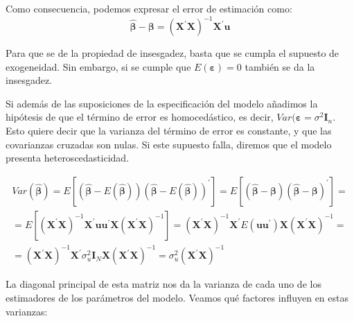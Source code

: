 Como consecuencia, podemos expresar el error de estimaci\'on como:
\begin{equation*}
\hat{\boldsymbol{\beta}}-\boldsymbol{\beta}=\left(\boldsymbol{X}^{\prime}\boldsymbol{X}\right)^{-1}\boldsymbol{X}^{\prime}\boldsymbol{u}
\end{equation*}

Para que se de la propiedad de insesgadez, basta que se cumpla el supuesto de exogeneidad. Sin embargo, si se cumple que $E(\boldsymbol{\varepsilon})=0$ tambi\'en se da la insesgadez.


Si adem\'as de las suposiciones de la especificaci\'on del modelo a\~nadimos la hip\'otesis de que el t\'ermino de error es homoced\'astico, es decir, $Var(\boldsymbol{\varepsilon}=\sigma^2\boldsymbol{I}_n$. Esto quiere decir que la varianza del t\'ermino de error es constante, y que las covarianzas cruzadas son nulas. Si este supuesto falla, diremos que el modelo presenta heteroscedasticidad.

\begin{equation*}
\begin{array}{c}
Var\left(\hat{\boldsymbol{\beta}}\right)=E\left[\left(\hat{\boldsymbol{\beta}}-E\left(\hat{\boldsymbol{\beta}}\right)\right)\left(\hat{\boldsymbol{\beta}}-E\left(\hat{\boldsymbol{\beta}}\right)\right)^{\prime}\right]=E\left[\left(\hat{\boldsymbol{\beta}}-\boldsymbol{\beta}\right)\left(\hat{\boldsymbol{\beta}}-\boldsymbol{\beta}\right)^{\prime}\right]=\\
=E\left[\left(\boldsymbol{X}^{\prime}\boldsymbol{X}\right)^{-1}\boldsymbol{X}^{\prime}\boldsymbol{u}\boldsymbol{u}^{\prime}\boldsymbol{X}\left(\boldsymbol{X}^{\prime}\boldsymbol{X}\right)^{-1}\right]=\left(\boldsymbol{X}^{\prime}\boldsymbol{X}\right)^{-1}\boldsymbol{X}^{\prime}E\left(\boldsymbol{u}\boldsymbol{u}^{\prime}\right)\boldsymbol{X}\left(\boldsymbol{X}^{\prime}\boldsymbol{X}\right)^{-1}=\\
=\left(\boldsymbol{X}^{\prime}\boldsymbol{X}\right)^{-1}\boldsymbol{X}^{\prime}\sigma_{u}^{2}\boldsymbol{I}_{N}\boldsymbol{X}\left(\boldsymbol{X}^{\prime}\boldsymbol{X}\right)^{-1}=\sigma_{u}^{2}\left(\boldsymbol{X}^{\prime}\boldsymbol{X}\right)^{-1}
\end{array}
\end{equation*}

La diagonal principal de esta matriz nos da la varianza de cada uno de los estimadores de los par\'ametros del modelo. Veamos qu\'e factores influyen en estas varianzas:

